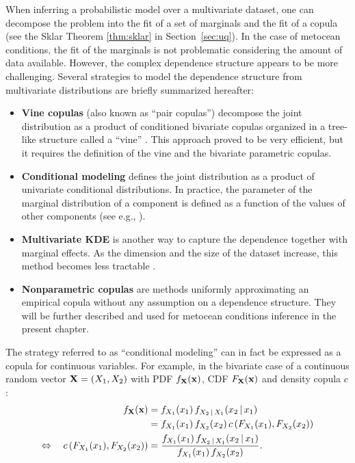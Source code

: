 When inferring a probabilistic model over a multivariate dataset, one can decompose the problem into the fit of a set of marginals and the fit of a copula (see the Sklar Theorem \ref{thm:sklar} in Section~\ref{sec:uq}). 
In the case of metocean conditions, the fit of the marginals is not problematic considering the amount of data available. 
However, the complex dependence structure appears to be more challenging. 
Several strategies to model the dependence structure from multivariate distributions are briefly summarized hereafter: 
\begin{itemize}
    \item \textbf{Vine copulas} (also known as ``pair copulas'') decompose the joint distribution as a product of conditioned bivariate copulas organized in a tree-like structure called a ``vine'' \citep{joe2011dependence}. 
    This approach proved to be very efficient, but it requires the definition of the vine and the bivariate parametric copulas. 
    \item \textbf{Conditional modeling} defines the joint distribution as a product of univariate conditional distributions. 
    In practice, the parameter of the marginal distribution of a component is defined as a function of the values of other components (see e.g., \citealp{vanem_fekhari_2023}). 
    \item \textbf{Multivariate KDE} is another way to capture the dependence together with marginal effects. As the dimension and the size of the dataset increase, this method becomes less tractable \citep{wand_jones_1994_kde}.  
    \item \textbf{Nonparametric copulas} are methods uniformly approximating an empirical copula without any assumption on a dependence structure. They will be further described and used for metocean conditions inference in the present chapter.    
\end{itemize}

\begin{remark}
    The strategy referred to as ``conditional modeling'' can in fact be expressed as a copula \citep{vanem_2016} for continuous variables. For example, in the bivariate case of a continuous random vector ${\bf X} = (X_1, X_2)$ with PDF $f_{\bf X}({\bf x})$, CDF $F_{\bf X}({\bf x})$ and density copula $c$: 
    \begin{subequations}
        \begin{align}
            f_{\bf X}({\bf x}) &= f_{X_1}(x_1) \, f_{X_2\, |\, X_1}(x_2\, |\, x_1) \\
                       &= f_{X_1}(x_1) \, f_{X_2}(x_2) \, c\left(F_{X_1}(x_1), F_{X_2}(x_2)\right)\\
            \Leftrightarrow \quad c\left(F_{X_1}(x_1), F_{X_2}(x_2)\right) &= \frac{f_{X_1}(x_1) \, f_{X_2\, |\, X_1}(x_2\, |\, x_1)}{f_{X_1}(x_1) \, f_{X_2}(x_2)}.
        \end{align}  
    \end{subequations}
\end{remark}

